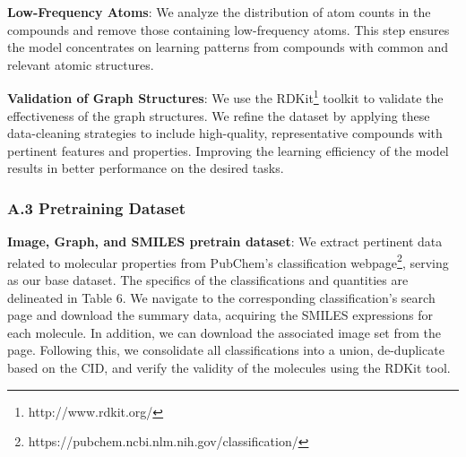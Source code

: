 \documentclass{article}
\begin{document}
\textbf{Low-Frequency Atoms}: We analyze the distribution of atom counts in the compounds and remove those containing low-frequency atoms. This step ensures the model concentrates on learning patterns from compounds with common and relevant atomic structures.
 
\textbf{Validation of Graph Structures}: We use the RDKit\footnote{http://www.rdkit.org/} toolkit to validate the effectiveness of the graph structures. We refine the dataset by applying these data-cleaning strategies to include high-quality, representative compounds with pertinent features and properties. Improving the learning efficiency of the model results in better performance on the desired tasks.

\subsubsection*{A.3 Pretraining Dataset}

\textbf{Image, Graph, and SMILES pretrain dataset}: We extract pertinent data related to molecular properties from PubChem's classification webpage\footnote{https://pubchem.ncbi.nlm.nih.gov/classification/}, serving as our base dataset. The specifics of the classifications and quantities are delineated in Table 6. We navigate to the corresponding classification's search page and download the summary data, acquiring the SMILES expressions for each molecule. In addition, we can download the associated image set from the page. Following this, we consolidate all classifications into a union, de-duplicate based on the CID, and verify the validity of the molecules using the RDKit tool.
\end{document}
